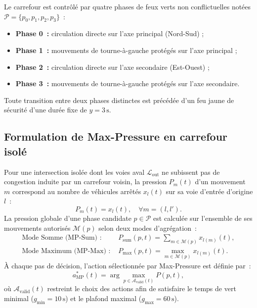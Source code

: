 \documentclass[11pt,a4paper]{article}
\begin{document}
Le carrefour est contrôlé par quatre phases de feux verts non conflictuelles notées $\mathcal{P} = \{p_0, p_1, p_2, p_3\}$~:
\begin{itemize}[nosep]
    \item \textbf{Phase 0~:} circulation directe sur l'axe principal (Nord-Sud) ;
    \item \textbf{Phase 1~:} mouvements de tourne-à-gauche protégés sur l'axe principal ;
    \item \textbf{Phase 2~:} circulation directe sur l'axe secondaire (Est-Ouest) ;
    \item \textbf{Phase 3~:} mouvements de tourne-à-gauche protégés sur l'axe secondaire.
\end{itemize}
Toute transition entre deux phases distinctes est précédée d'un feu jaune de sécurité d'une durée fixe de $y = 3\,\mathrm{s}$.

\subsection{Formulation de Max-Pressure en carrefour isolé}
Pour une intersection isolée dont les voies aval $\mathcal{L}_{\text{out}}$ ne subissent pas de congestion induite par un carrefour voisin, la pression $P_m(t)$ d'un mouvement $m$ correspond au nombre de véhicules arrêtés $x_l(t)$ sur sa voie d'entrée d'origine $l$~:
\begin{equation}
P_m(t) = x_l(t), \quad \forall m = (l, l').
\end{equation}
La pression globale d'une phase candidate $p \in \mathcal{P}$ est calculée sur l'ensemble de ses mouvements autorisés $\mathcal{M}(p)$ selon deux modes d'agrégation~:
\begin{align}
\text{Mode Somme (MP-Sum) : } & P_{\text{sum}}(p, t) = \sum_{m \in \mathcal{M}(p)} x_{l(m)}(t), \label{eq:mp_sum} \\
\text{Mode Maximum (MP-Max) : } & P_{\text{max}}(p, t) = \max_{m \in \mathcal{M}(p)} x_{l(m)}(t). \label{eq:mp_max}
\end{align}
À chaque pas de décision, l'action sélectionnée par Max-Pressure est définie par~:
\begin{equation}
a_{\text{MP}}^*(t) = \arg\max_{p \in \mathcal{A}_{\text{valid}}(t)} P(p, t),
\end{equation}
où $\mathcal{A}_{\text{valid}}(t)$ restreint le choix des actions afin de satisfaire le temps de vert minimal ($g_{\min} = 10\,\mathrm{s}$) et le plafond maximal ($g_{\max} = 60\,\mathrm{s}$).
\end{document}
